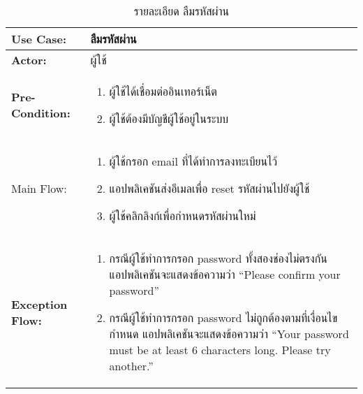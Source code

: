\begin{table}
    \caption{รายละเอียด ลืมรหัสผ่าน}
    \begin{tabularx}{\textwidth}{ | >{\centering\bf} p{3cm} | X |}
        \hline
        Use Case: & ลืมรหัสผ่าน \\\hline
        Actor: & ผู้ใช้ \\\hline
        Pre-Condition: &
        \begin{enumerate}[table]
            \item ผู้ใช้ได้เชื่อมต่ออินเทอร์เน็ต
            \item ผู้ใช้ต้องมีบัญชีผู้ใช้อยู่ในระบบ
        \end{enumerate} \\\hline
        
        Main Flow: & 
        \begin{enumerate}[table]
            \item ผู้ใช้กรอก email ที่ได้ทำการลงทะเบียนไว้
            \item แอปพลิเคชันส่งอีเมลเพื่อ reset รหัสผ่านไปยังผู้ใช้
            \item ผู้ใช้คลิกลิงก์เพื่อกำหนดรหัสผ่านใหม่
        \end{enumerate}\\\hline
        Exception Flow: & 
        \begin{enumerate}[table]
            \item กรณีผู้ใช้ทำการกรอก password ทั้งสองช่องไม่ตรงกัน แอปพลิเคชันจะแสดงข้อความว่า “Please confirm your password”
            \item กรณีผู้ใช้ทำการกรอก password ไม่ถูกต้องตามที่เงื่อนไขกำหนด แอปพลิเคชันจะแสดงข้อความว่า “Your password must be at least 6 characters long. Please try another.”
        \end{enumerate}\\\hline
    \end{tabularx}
\end{table}


